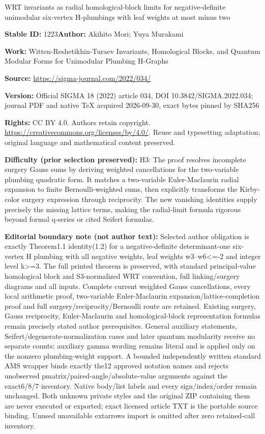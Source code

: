 \documentclass[11pt]{article}
\numberwithin{equation}{section}
\numberwithin{equation}{section}
\begin{document}
\begin{center}\Large WRT invariants as radial homological-block limits for negative-definite unimodular six-vertex H-plumbings with leaf weights at most minus two\end{center}
\noindent\textbf{Stable ID:} 1223\quad\textbf{Author:} Akihito Mori; Yuya Murakami\par
\noindent\textbf{Work:} Witten-Reshetikhin-Turaev Invariants, Homological Blocks, and Quantum Modular Forms for Unimodular Plumbing H-Graphs\par
\noindent\textbf{Source:} \url{https://sigma-journal.com/2022/034/}\par
\noindent\textbf{Version:} Official SIGMA 18 (2022) article 034, DOI 10.3842/SIGMA.2022.034; journal PDF and native TeX acquired 2026-09-30, exact bytes pinned by SHA256\par
\noindent\textbf{Rights:} CC BY 4.0. Authors retain copyright. \url{https://creativecommons.org/licenses/by/4.0/}. Reuse and typesetting adaptation; original language and mathematical content preserved.\par
\noindent\textbf{Difficulty (prior selection preserved):} {\CJKfont H3: The proof resolves incomplete surgery Gauss sums by deriving weighted cancellations for the two-variable plumbing quadratic form. It matches a two-variable Euler-Maclaurin radial expansion to finite Bernoulli-weighted sums, then explicitly transforms the Kirby-color surgery expression through reciprocity. The new vanishing identities supply precisely the missing lattice terms, making the radial-limit formula rigorous beyond formal q-series or cited Seifert formulas.}\par
\medskip\noindent\textbf{Editorial boundary note (not author text):} Selected author obligation is exactly Theorem1.1 identity(1.2) for a negative-definite determinant-one six-vertex H plumbing with all negative weights, leaf weights w3–w6<=-2 and integer level k>=3. The full printed theorem is preserved, with standard principal-value homological block and S3-normalized WRT convention, full linking/surgery diagrams and all inputs. Complete current weighted Gauss cancellations, every local arithmetic proof, two-variable Euler-Maclaurin expansion/lattice-completion proof and full surgery/reciprocity/Bernoulli route are retained. Existing surgery, Gauss reciprocity, Euler-Maclaurin and homological-block representation formulas remain precisely stated author prerequisites. General auxiliary statements, Seifert/degenerate-normalization cases and later quantum modularity receive no separate counts; auxiliary gamma wording remains literal and is applied only on the nonzero plumbing-weight support. A bounded independently written standard AMS wrapper binds exactly the12 approved notation names and rejects unobserved pmatrix/paired-angle/absolute-value arguments against the exact6/8/7 inventory. Native body/list labels and every sign/index/order remain unchanged. Both unknown private styles and the original ZIP containing them are never executed or exported; exact licensed article TXT is the portable source binding. Unused unavailable extarrows import is omitted after zero retained-call inventory.\par
\end{document}
